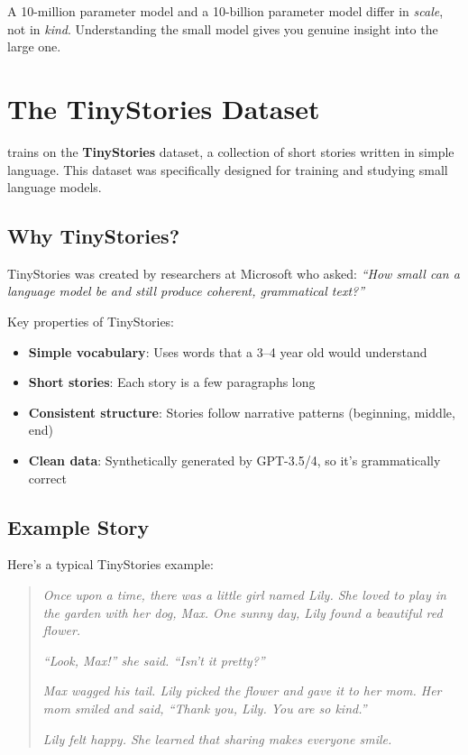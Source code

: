 \begin{keypoint}
A 10-million parameter model and a 10-billion parameter model differ in \textit{scale}, not in \textit{kind}. Understanding the small model gives you genuine insight into the large one.
\end{keypoint}

\section{The TinyStories Dataset}

\TryLM trains on the \textbf{TinyStories} dataset, a collection of short stories written in simple language. This dataset was specifically designed for training and studying small language models.

\subsection{Why TinyStories?}

TinyStories was created by researchers at Microsoft who asked: \textit{``How small can a language model be and still produce coherent, grammatical text?''}

Key properties of TinyStories:
\begin{itemize}
    \item \textbf{Simple vocabulary}: Uses words that a 3--4 year old would understand
    \item \textbf{Short stories}: Each story is a few paragraphs long
    \item \textbf{Consistent structure}: Stories follow narrative patterns (beginning, middle, end)
    \item \textbf{Clean data}: Synthetically generated by GPT-3.5/4, so it's grammatically correct
\end{itemize}

\subsection{Example Story}

Here's a typical TinyStories example:

\begin{quote}
\textit{Once upon a time, there was a little girl named Lily. She loved to play in the garden with her dog, Max. One sunny day, Lily found a beautiful red flower.}

\textit{``Look, Max!'' she said. ``Isn't it pretty?''}

\textit{Max wagged his tail. Lily picked the flower and gave it to her mom. Her mom smiled and said, ``Thank you, Lily. You are so kind.''}

\textit{Lily felt happy. She learned that sharing makes everyone smile.}
\end{quote}

